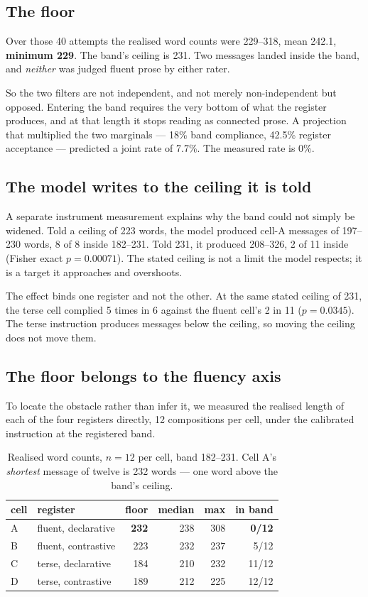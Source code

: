\documentclass[11pt]{article}
\begin{document}
\subsection{The floor}

Over those 40 attempts the realised word counts were 229--318, mean 242.1,
\textbf{minimum 229}. The band's ceiling is 231. Two messages landed inside the
band, and \emph{neither} was judged fluent prose by either rater.

So the two filters are not independent, and not merely non-independent but
opposed. Entering the band requires the very bottom of what the register
produces, and at that length it stops reading as connected prose. A projection
that multiplied the two marginals --- 18\% band compliance, 42.5\% register
acceptance --- predicted a joint rate of 7.7\%. The measured rate is 0\%.

\subsection{The model writes to the ceiling it is told}

A separate instrument measurement explains why the band could not simply be
widened. Told a ceiling of 223 words, the model produced cell-A messages of
197--230 words, 8 of 8 inside 182--231. Told 231, it produced 208--326, 2 of 11
inside (Fisher exact $p = 0.00071$). The stated ceiling is not a limit the model
respects; it is a target it approaches and overshoots.

The effect binds one register and not the other. At the same stated ceiling of
231, the terse cell complied 5 times in 6 against the fluent cell's 2 in 11
($p = 0.0345$). The terse instruction produces messages below the ceiling, so
moving the ceiling does not move them.

\subsection{The floor belongs to the fluency axis}

To locate the obstacle rather than infer it, we measured the realised length of
each of the four registers directly, 12 compositions per cell, under the
calibrated instruction at the registered band.

\begin{table}[h]
\centering
\begin{tabular}{llrrrr}
\toprule
cell & register & floor & median & max & in band \\
\midrule
A & fluent, declarative     & \textbf{232} & 238 & 308 & \textbf{0/12} \\
B & fluent, contrastive     & 223 & 232 & 237 & 5/12 \\
C & terse, declarative      & 184 & 210 & 232 & 11/12 \\
D & terse, contrastive      & 189 & 212 & 225 & 12/12 \\
\bottomrule
\end{tabular}
\caption{Realised word counts, $n = 12$ per cell, band 182--231. Cell A's
\emph{shortest} message of twelve is 232 words --- one word above the band's
ceiling.}
\label{tab:floor}
\end{table}
\end{document}
